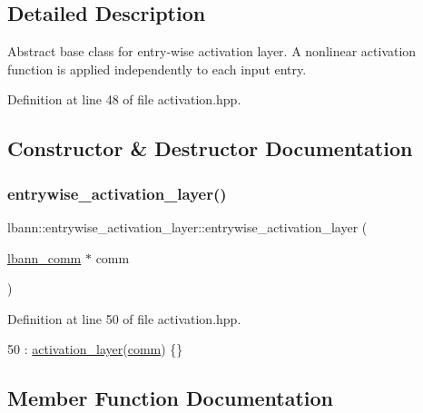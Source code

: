 \subsection{Detailed Description}
Abstract base class for entry-\/wise activation layer. A nonlinear activation function is applied independently to each input entry. 

Definition at line 48 of file activation.\+hpp.



\subsection{Constructor \& Destructor Documentation}
\mbox{\label{classlbann_1_1entrywise__activation__layer_aada1d9200612dcd13259799ef327c557}} 
\subsubsection{\texorpdfstring{entrywise\+\_\+activation\+\_\+layer()}{entrywise\_activation\_layer()}}
{\footnotesize\ttfamily lbann\+::entrywise\+\_\+activation\+\_\+layer\+::entrywise\+\_\+activation\+\_\+layer (\begin{DoxyParamCaption}\item[{\hyperlink{classlbann_1_1lbann__comm}{lbann\+\_\+comm} $\ast$}]{comm }\end{DoxyParamCaption})\hspace{0.3cm}{\ttfamily [inline]}}



Definition at line 50 of file activation.\+hpp.


\begin{DoxyCode}
50 : \hyperlink{classlbann_1_1activation__layer_a7df6f5d21ccdd5a24ad6233a52807c6d}{activation\_layer}(\hyperlink{file__io_8cpp_ab048c6f9fcbcfaa57ce68b00263dbebe}{comm}) \{\}
\end{DoxyCode}


\subsection{Member Function Documentation}
\mbox{\label{classlbann_1_1entrywise__activation__layer_a69269401530a2112b66660383464bab9}} 
